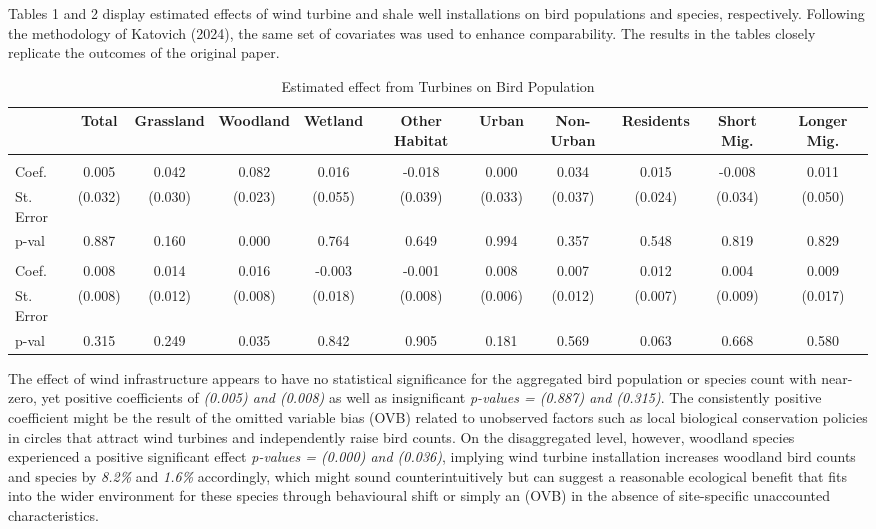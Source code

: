 \documentclass{article}
\begin{document}
\addlinespace

Tables 1 and 2 display estimated effects of wind turbine and shale well installations on bird populations and species, respectively. Following the methodology of Katovich (2024), the same set of covariates was used to enhance comparability. The results in the tables closely replicate the outcomes of the original paper. 

\begin{table}[!ht]
\centering
\caption{Estimated effect from Turbines on Bird Population}
\begin{adjustbox}{width=\textwidth}
\begin{tabular}{@{}lcccccccccc@{}}
\toprule
 & Total & Grassland & Woodland & Wetland & Other Habitat & Urban & Non-Urban & Residents & Short Mig. & Longer Mig. \\
\midrule
\addlinespace
\multicolumn{11}{l}{\hspace{-0.5em}\textbf{Total count}} \\
Coef. & 0.005 & 0.042 & 0.082 & 0.016 & -0.018 & 0.000 & 0.034 & 0.015 & -0.008 & 0.011 \\
St. Error & (0.032) & (0.030) & (0.023) & (0.055) & (0.039) & (0.033) & (0.037) & (0.024) & (0.034) & (0.050) \\
p-val & 0.887 & 0.160 & 0.000 & 0.764 & 0.649 & 0.994 & 0.357 & 0.548 & 0.819 & 0.829 \\
\addlinespace
\multicolumn{11}{l}{\hspace{-0.5em}\textbf{Total species}} \\
Coef. & 0.008 & 0.014 & 0.016 & -0.003 & -0.001 & 0.008 & 0.007 & 0.012 & 0.004 & 0.009 \\
St. Error & (0.008) & (0.012) & (0.008) & (0.018) & (0.008) & (0.006) & (0.012) & (0.007) & (0.009) & (0.017) \\
p-val & 0.315 & 0.249 & 0.035 & 0.842 & 0.905 & 0.181 & 0.569 & 0.063 & 0.668 & 0.580 \\
\bottomrule
\end{tabular}
\end{adjustbox}
\end{table}

\addlinespace

The effect of wind infrastructure appears to have no statistical significance for the aggregated bird population or species count with near-zero, yet positive coefficients of \textit{(0.005) and (0.008)} as well as insignificant \textit{p-values = (0.887) and (0.315)}. The consistently positive coefficient might be the result of the omitted variable bias (OVB) related to unobserved factors such as local biological conservation policies in circles that attract wind turbines and independently raise bird counts. On the disaggregated level, however, woodland species experienced a positive significant effect \textit{p-values = (0.000) and (0.036)}, implying wind turbine installation increases woodland bird counts and species by \textit{8.2\%} and \textit{1.6\%} accordingly, which might sound counterintuitively but can suggest a reasonable ecological benefit that fits into the wider environment for these species through behavioural shift or simply an (OVB) in the absence of site-specific unaccounted characteristics.
\end{document}
